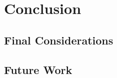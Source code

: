 \chapter{Conclusion}\label{conclusion}

\section{Final Considerations}\label{conclusion:s:final-considerations}

\section{Future Work}\label{conclusion:s:future-work}
